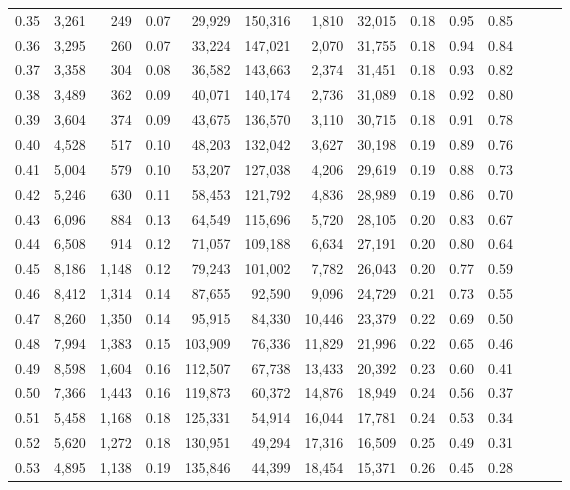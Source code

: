 \begin{tabular}{rrrrrrrrrrrrrr}
0.35 &  3,261 &    249 &  0.07 &   29,929 &  150,316 &   1,810 &  32,015 &  0.18 &  0.95 &      0.85 \\
0.36 &  3,295 &    260 &  0.07 &   33,224 &  147,021 &   2,070 &  31,755 &  0.18 &  0.94 &      0.84 \\
0.37 &  3,358 &    304 &  0.08 &   36,582 &  143,663 &   2,374 &  31,451 &  0.18 &  0.93 &      0.82 \\
0.38 &  3,489 &    362 &  0.09 &   40,071 &  140,174 &   2,736 &  31,089 &  0.18 &  0.92 &      0.80 \\
0.39 &  3,604 &    374 &  0.09 &   43,675 &  136,570 &   3,110 &  30,715 &  0.18 &  0.91 &      0.78 \\
0.40 &  4,528 &    517 &  0.10 &   48,203 &  132,042 &   3,627 &  30,198 &  0.19 &  0.89 &      0.76 \\
0.41 &  5,004 &    579 &  0.10 &   53,207 &  127,038 &   4,206 &  29,619 &  0.19 &  0.88 &      0.73 \\
0.42 &  5,246 &    630 &  0.11 &   58,453 &  121,792 &   4,836 &  28,989 &  0.19 &  0.86 &      0.70 \\
0.43 &  6,096 &    884 &  0.13 &   64,549 &  115,696 &   5,720 &  28,105 &  0.20 &  0.83 &      0.67 \\
0.44 &  6,508 &    914 &  0.12 &   71,057 &  109,188 &   6,634 &  27,191 &  0.20 &  0.80 &      0.64 \\
0.45 &  8,186 &  1,148 &  0.12 &   79,243 &  101,002 &   7,782 &  26,043 &  0.20 &  0.77 &      0.59 \\
0.46 &  8,412 &  1,314 &  0.14 &   87,655 &   92,590 &   9,096 &  24,729 &  0.21 &  0.73 &      0.55 \\
0.47 &  8,260 &  1,350 &  0.14 &   95,915 &   84,330 &  10,446 &  23,379 &  0.22 &  0.69 &      0.50 \\
0.48 &  7,994 &  1,383 &  0.15 &  103,909 &   76,336 &  11,829 &  21,996 &  0.22 &  0.65 &      0.46 \\
0.49 &  8,598 &  1,604 &  0.16 &  112,507 &   67,738 &  13,433 &  20,392 &  0.23 &  0.60 &      0.41 \\
0.50 &  7,366 &  1,443 &  0.16 &  119,873 &   60,372 &  14,876 &  18,949 &  0.24 &  0.56 &      0.37 \\
0.51 &  5,458 &  1,168 &  0.18 &  125,331 &   54,914 &  16,044 &  17,781 &  0.24 &  0.53 &      0.34 \\
0.52 &  5,620 &  1,272 &  0.18 &  130,951 &   49,294 &  17,316 &  16,509 &  0.25 &  0.49 &      0.31 \\
0.53 &  4,895 &  1,138 &  0.19 &  135,846 &   44,399 &  18,454 &  15,371 &  0.26 &  0.45 &      0.28 \\

\end{tabular}

